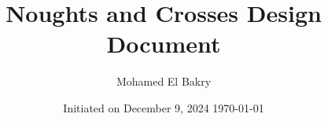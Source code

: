 \documentclass[a4paper,12pt]{article}
\newcommand{\name}{Mohamed El Bakry}
\newcommand{\mytitle}{Noughts and Crosses Design Document}
\begin{document}
\title{\mytitle}
\author{\name}
\date{Initiated on December 9, 2024 \break \today} 
\maketitle

\tableofcontents
\listoffigures
\listoftables
 
\pagestyle{plain}










\end{document}
